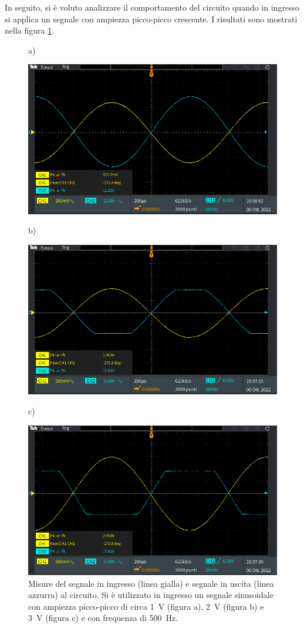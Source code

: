 \clearpage
In seguito, si è voluto analizzare il comportamento del circuito quando in ingresso si applica un segnale con ampiezza picco-picco crescente. I risultati sono mostrati nella figura \ref{fig:misure_oscilloscopio_sat}.
\begin{figure}[h!]
	\centering
	a)
	
	\includegraphics[width=0.8\linewidth]{./ImageFiles/Laboratorio 1/TEK00008}	
\end{figure}
\begin{figure}[h!]
	\centering
	b)
	
	\includegraphics[width=0.8\linewidth]{./ImageFiles/Laboratorio 1/TEK00009}
\end{figure}
\begin{figure}[h!]
	\centering
	c)
	
	\includegraphics[width=0.8\linewidth]{./ImageFiles/Laboratorio 1/TEK00010}
	\caption{Misure del segnale in ingresso (linea gialla) e segnale in uscita (linea azzurra) al circuito. Si è utilizzato in ingresso un segnale sinusoidale con ampiezza picco-picco di circa \SI{1}{\volt} (figura a), \SI{2}{\volt} (figura b) e \SI{3}{\volt} (figura c) e con frequenza di \SI{500}{\hertz}.}
	\label{fig:misure_oscilloscopio_sat}
\end{figure} 

